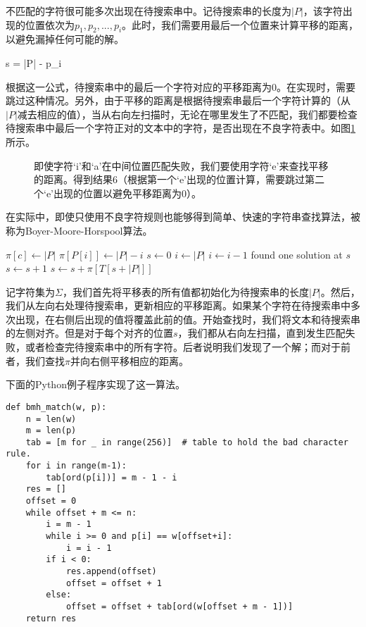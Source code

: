 \documentclass[UTF8]{article}
\begin{document}
不匹配的字符很可能多次出现在待搜索串中。记待搜索串的长度为$|P|$，该字符出现的位置依次为$p_1, p_2, ..., p_i$。此时，我们需要用最后一个位置来计算平移的距离，以避免漏掉任何可能的解。

\be
s = |P| - p_i
\ee

根据这一公式，待搜索串中的最后一个字符对应的平移距离为0。在实现时，需要跳过这种情况。另外，由于平移的距离是根据待搜索串最后一个字符计算的（从$|P|$减去相应的值），当从右向左扫描时，无论在哪里发生了不匹配，我们都要检查待搜索串中最后一个字符正对的文本中的字符，是否出现在不良字符表中。如图\ref{fig:good-char-2}所示。

\begin{figure}[htbp]
 \centering
 \caption{即使字符‘i’和‘a’在中间位置匹配失败，我们要使用字符‘e’来查找平移的距离。得到结果6（根据第一个‘e’出现的位置计算，需要跳过第二个‘e’出现的位置以避免平移距离为0）。}
 \label{fig:good-char-2}
\end{figure}

在实际中，即使只使用不良字符规则也能够得到简单、快速的字符串查找算法，被称为Boyer-Moore-Horspool算法\cite{boyer-moore-horspool}。

\begin{algorithmic}[1]
    \State $\pi[c] \gets |P|$
  \EndFor
   
    \State $\pi[P[i]] \gets |P| - i$
  \EndFor
  \State $s \gets 0$
    \State $i \gets |P|$
     
      \State $i \gets i - 1$
    \EndWhile
      \State found one solution at $s$
      \State $s \gets s + 1$ 
    \Else
      \State $s \gets s + \pi[T[s + |P|]]$
    \EndIf
  \EndWhile
\EndProcedure
\end{algorithmic}

记字符集为$\Sigma$，我们首先将平移表的所有值都初始化为待搜索串的长度$|P|$。然后，我们从左向右处理待搜索串，更新相应的平移距离。如果某个字符在待搜索串中多次出现，在右侧后出现的值将覆盖此前的值。开始查找时，我们将文本和待搜索串的左侧对齐。但是对于每个对齐的位置$s$，我们都从右向左扫描，直到发生匹配失败，或者检查完待搜索串中的所有字符。后者说明我们发现了一个解；而对于前者，我们查找$\pi$并向右侧平移相应的距离。

下面的Python例子程序实现了这一算法。

\lstset{language=Python}
\begin{lstlisting}
def bmh_match(w, p):
    n = len(w)
    m = len(p)
    tab = [m for _ in range(256)]  # table to hold the bad character rule.
    for i in range(m-1):
        tab[ord(p[i])] = m - 1 - i
    res = []
    offset = 0
    while offset + m <= n:
        i = m - 1
        while i >= 0 and p[i] == w[offset+i]:
            i = i - 1
        if i < 0:
            res.append(offset)
            offset = offset + 1
        else:
            offset = offset + tab[ord(w[offset + m - 1])]
    return res
\end{lstlisting}
\end{document}
